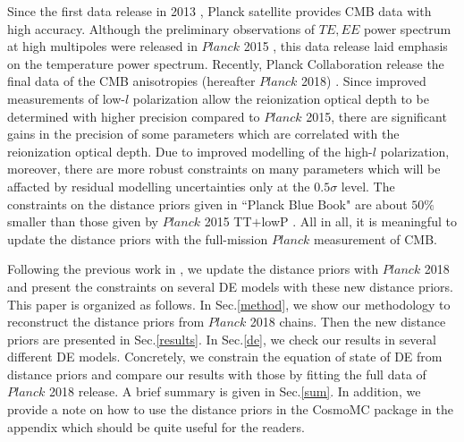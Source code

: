 \documentclass[floatfix,aps,amsmath,nofootinbib,onecolumn,10pt]{revtex4}
\begin{document}
Since the first data release in 2013 \cite{Ade:2013zuv}, Planck satellite provides CMB data with high accuracy. Although the preliminary observations of $TE, EE$ power spectrum at high multipoles were released in $Planck$ 2015 \cite{Ade:2015xua}, this data release laid emphasis on the temperature power spectrum.
Recently, Planck Collaboration release the final data of the CMB anisotropies (hereafter $Planck$ 2018) \cite{Aghanim:2018eyx}. 
Since improved measurements of low-$l$ polarization allow the reionization optical depth to be determined with higher precision compared to $Planck$ 2015, there are significant gains in the precision of some parameters which are correlated with the reionization optical depth. Due to improved modelling of the high-$l$ polarization, moreover, there are more robust constraints on many parameters which will be affacted by residual modelling uncertainties only at the $0.5\sigma$ level.
The constraints on the distance priors given in ``Planck Blue Book" \cite{Planck:2006aa} are  about $50\%$ smaller than those given by $Planck$ 2015 TT$+$lowP \cite{Ade:2015rim}.
All in all, it is meaningful to update the distance priors with the full-mission $Planck$ measurement of CMB.

Following the previous work in \cite{Huang:2015vpa}, we update the distance priors with $Planck$ 2018 and present the constraints on several DE models with these new distance priors. This paper is organized as follows. In Sec.\ref{method},  we show our methodology to reconstruct the distance priors from $Planck$ 2018 chains. Then the new distance priors are  presented in Sec.\ref{results}. In Sec.\ref{de}, we check our results in several different DE models. Concretely, we constrain the equation of state of DE from distance priors and compare our results with those by fitting the full data of $Planck$ 2018 release. A brief summary is given in Sec.\ref{sum}. In addition, we provide a note on how to use the distance priors in the CosmoMC package in the appendix which should be quite useful for the readers. 
\end{document}
